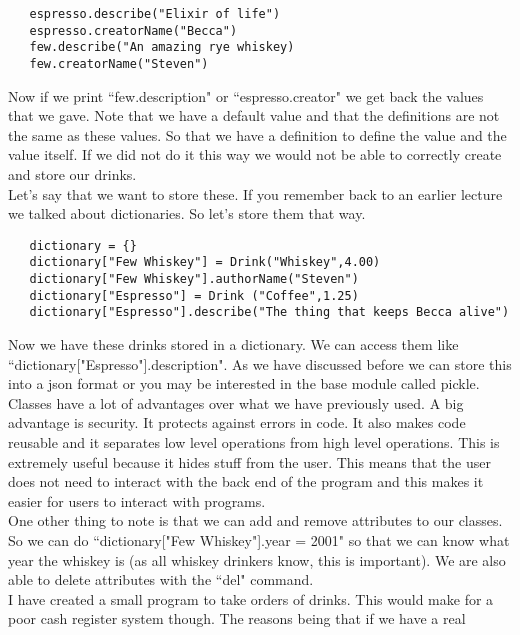 \documentclass[11pt]{article}   %
\begin{document}
\begin{tcolorbox}
   \begin{lstlisting}
   espresso.describe("Elixir of life")
   espresso.creatorName("Becca")
   few.describe("An amazing rye whiskey)
   few.creatorName("Steven")
   \end{lstlisting}
\end{tcolorbox}
Now if we print ``few.description" or ``espresso.creator" we get back the values that we gave.  Note that we have a default value and that the 
definitions are not the same as these values.  So that we have a definition to define the value and the value itself.  If we did not do it this way we
would not be able to correctly create and store our drinks.  
\\
Let's say that we want to store these.  If you remember back to an earlier lecture we talked about dictionaries.  So let's store them that way.
\begin{tcolorbox}
   \begin{lstlisting}
   dictionary = {}
   dictionary["Few Whiskey"] = Drink("Whiskey",4.00)
   dictionary["Few Whiskey"].authorName("Steven")
   dictionary["Espresso"] = Drink ("Coffee",1.25)
   dictionary["Espresso"].describe("The thing that keeps Becca alive")
   \end{lstlisting}
\end{tcolorbox}
Now we have these drinks stored in a dictionary.  We can access them like ``dictionary["Espresso"].description".  As we have discussed before we can store
this into a json format or you may be interested in the base module called pickle.
\\
Classes have a lot of advantages over what we have previously used.  A big advantage is security.  It protects against errors in code.  It also makes code
reusable and it separates low level operations from high level operations.  This is extremely useful because it hides stuff from the user.  This means
that the user does not need to interact with the back end of the program and this makes it easier for users to interact with programs.  
\\
One other thing to note is that we can add and remove attributes to our classes.  So we can do ``dictionary["Few Whiskey"].year = 2001" so that we can know 
what year the whiskey is (as all whiskey drinkers know, this is important).  We are also able to delete attributes with the ``del" command.  
\\
I have created a small program to take orders of drinks.  This would make for a poor cash register system though.  The reasons being that if we have a real
\end{document}
